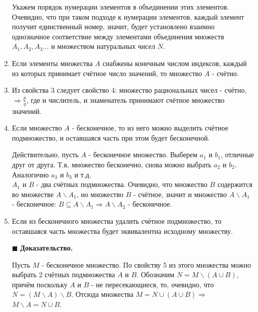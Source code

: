 \documentclass[12pt, a4paper, oneside]{article}
\theoremstyle{plain} %
\theoremstyle{definition}
\begin{document}
\begin{enumerate}
\begin{figure}[h!]
\begin{center}
\begin{tikzpicture}[line cap=round,line join=round,>=triangle 45,x=1.0cm,y=1.0cm]
\end{tikzpicture}
   
    \end{center}
   
    \end{figure}
    
    Укажем порядок нумерации элементов в объединении этих элементов. Очевидно, что при таком подходе к нумерации элементов, каждый элемент получит единственный номер, значит, будет установлено взаимно однозначное соответствие между элементами объединения множеств $A_1, A_2, A_3...$ и множеством натуральных чисел $N$.
    
    \item Если элементы множества $A$  снабжены конечным числом индексов, каждый из которых принимает счётное число значений, то множество $A$ - счётно.
    
    \item Из свойства 3 следует свойство 4: множество рациональных чисел - счётно, $\Rightarrow \frac{p}{q}$, где и числитель, и знаменатель принимают счётное множество значений.
    
    \item Если множество $A$ - бесконечное, то из него можно выделить счётное подмножество, и оставшаяся часть при этом будет бесконечной. 
    
    
    Действительно, пусть $A$ - бесконечное множество. Выберем $a_1$ и $b_1$, отличные друг от друга. Т.к. множество бесконечно, снова можно выбрать $a_2$ и $b_2$. Аналогично $a_3$ и $b_3$ и т.д.\\
    $A_1$ и $B$ - два счётных подмножества. Очевидно, что множество $B$ содержится во множестве $A \backslash A_1$, но множество $B$ - счётное, значит и множество $A \backslash A_1$ - бесконечное: $B \subseteq A \backslash A_1 \Rightarrow A \backslash A_2$ - бесконечное. 
    
    \item Если из бесконечного множества удалить счётное подмножество, то оставшаяся часть множества будет эквивалентна исходному множеству. 
    
    
    \(\blacksquare\) \textbf{Доказательство.} 
    
    
    Пусть $M$ - бесконечное множество. По свойству 5 из этого множества можно выбрать 2 счётных подмножества $A$ и $B$. Обозначим $N = M \backslash (A \cup B)$, причём поскольку $A$ и $B$ - не пересекающиеся, то, очевидно, что $N = (M \backslash A) \backslash B$. Отсюда множества $M = N \cup (A \cup B) \Rightarrow$ $M \backslash A = N \cup B$.
    

\end{enumerate}
\end{document}

